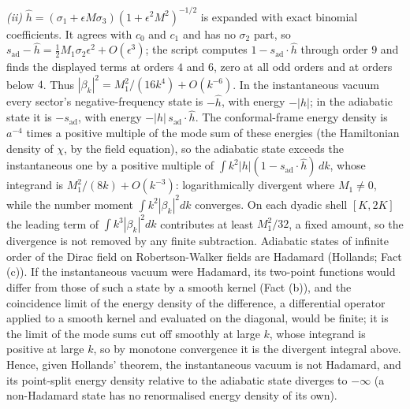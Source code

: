 \emph{(ii)} $\hat h = (\sigma_{1} + \epsilon M\sigma_{3})(1 + \epsilon^{2}M^{2})^{-1/2}$ is expanded with exact binomial coefficients. It agrees with $c_{0}$ and $c_{1}$ and has no $\sigma_{2}$ part, so $s_{\mathrm{ad}} - \hat h = \tfrac12M_{1}\sigma_{2}\epsilon^{2} + O(\epsilon^{3})$; the script computes $1 - s_{\mathrm{ad}}\cdot\hat h$ through order $9$ and finds the displayed terms at orders $4$ and $6$, zero at all odd orders and at orders below $4$. Thus $|\beta_{k}|^{2} = M_{1}^{2}/(16k^{4}) + O(k^{-6})$. In the instantaneous vacuum every sector's negative-frequency state is $-\hat h$, with energy $-|h|$; in the adiabatic state it is $-s_{\mathrm{ad}}$, with energy $-|h|\,s_{\mathrm{ad}}\cdot\hat h$. The conformal-frame energy density is $a^{-4}$ times a positive multiple of the mode sum of these energies (the Hamiltonian density of $\chi$, by the field equation), so the adiabatic state exceeds the instantaneous one by a positive multiple of $\int k^{2}|h|(1 - s_{\mathrm{ad}}\cdot\hat h)\,dk$, whose integrand is $M_{1}^{2}/(8k) + O(k^{-3})$: logarithmically divergent where $M_{1} \neq 0$, while the number moment $\int k^{2}|\beta_{k}|^{2}dk$ converges. On each dyadic shell $[K, 2K]$ the leading term of $\int k^{3}|\beta_{k}|^{2}dk$ contributes at least $M_{1}^{2}/32$, a fixed amount, so the divergence is not removed by any finite subtraction. Adiabatic states of infinite order of the Dirac field on Robertson-Walker fields are Hadamard (Hollands; Fact (c)). If the instantaneous vacuum were Hadamard, its two-point functions would differ from those of such a state by a smooth kernel (Fact (b)), and the coincidence limit of the energy density of the difference, a differential operator applied to a smooth kernel and evaluated on the diagonal, would be finite; it is the limit of the mode sums cut off smoothly at large $k$, whose integrand is positive at large $k$, so by monotone convergence it is the divergent integral above. Hence, given Hollands' theorem, the instantaneous vacuum is not Hadamard, and its point-split energy density relative to the adiabatic state diverges to $-\infty$ (a non-Hadamard state has no renormalised energy density of its own).

